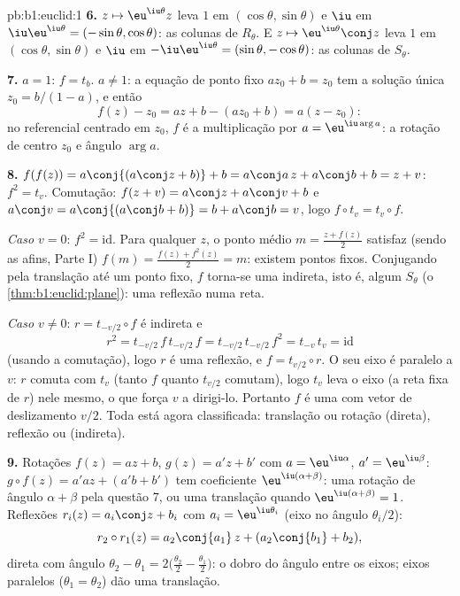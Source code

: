 \begin{solution}{pb:b1:euclid:1}
\textbf{6.} $z \mapsto \eu^{\iu\theta}z$ leva $1$ em $(\cos\theta, \sin\theta)$ e $\iu$ em $\iu\eu^{\iu\theta} = (-\sin\theta, \cos\theta)$: as colunas de
$R_\theta$. E $z \mapsto \eu^{\iu\theta}\conj z$ leva $1$ em $(\cos\theta, \sin\theta)$ e $\iu$ em $-\iu\eu^{\iu\theta} =
(\sin\theta, -\cos\theta)$: as colunas de
$S_\theta$.

\textbf{7.} $a = 1$: $f = t_b$. $a \neq 1$: a equação de ponto fixo $az_0 + b = z_0$
tem a solução única $z_0 = b/(1 -
a)$, e então
\[
f(z) - z_0 = az + b - (az_0 + b) = a(z - z_0):
\]
no referencial centrado em $z_0$, $f$ é a multiplicação por $a
= \eu^{\iu\arg a}$:
a rotação de centro $z_0$ e ângulo $\arg a$.

\textbf{8.} $f(f(z)) = a\conj{(a\conj z + b)} + b = a\conj a\,z
+ a\conj b + b = z + v$: $f^2 = t_v$. Comutação: $f(z + v) =
a\conj z + a\conj v + b$ e $a\conj v = a\conj{(a\conj b + b)}
= b + a\conj b = v$, logo $f\circ t_v = t_v\circ f$.

\emph{Caso $v = 0$}: $f^2 = \mathrm{id}$. Para qualquer $z$, o ponto médio $m = \frac{z + f(z)}2$
satisfaz (sendo as  afins, Parte I) $f(m) = \frac{f(z) + f^2(z)}{2} = m$: existem pontos
fixos. Conjugando pela translação até um ponto fixo, $f$ torna-se
uma   indireta, isto é, algum $S_\theta$ (o \cref{thm:b1:euclid:plane}): uma
reflexão numa reta.

\emph{Caso $v \neq 0$}: $r = t_{-v/2}\circ f$ é indireta e
\[
r^2 = t_{-v/2}\,f\,t_{-v/2}\,f = t_{-v/2}\,t_{-v/2}\,f^2
= t_{-v}\,t_v = \mathrm{id}
\]
(usando a comutação), logo $r$ é uma reflexão, e $f =
t_{v/2}\circ r$. O seu eixo
é paralelo a $v$: $r$ comuta com $t_v$ (tanto $f$ quanto $t_{v/2}$
comutam), logo $t_v$ leva o eixo (a reta fixa de $r$) nele mesmo, o
que força $v$ a dirigi-lo. Portanto $f$ é uma 
com vetor de deslizamento $v/2$. Toda  está agora
classificada: translação ou rotação (direta), reflexão ou  (indireta).

\textbf{9.} Rotações $f(z) = az + b$, $g(z) = a'z + b'$ com $a = \eu^{\iu\alpha}$, $a' = \eu^{\iu\beta}$: $g\circ f(z) =
a'az + (a'b + b')$ tem
coeficiente  $\eu^{\iu(\alpha+\beta)}$: uma rotação de ângulo $\alpha + \beta$ pela questão
7, ou uma translação quando $\eu^{\iu(\alpha+\beta)} =
1$. Reflexões $r_i(z) = a_i\conj z + b_i$ com $a_i =
\eu^{\iu\theta_i}$ (eixo
no ângulo $\theta_i/2$):
\[
r_2\circ r_1(z) = a_2\conj{a_1}\,z + (a_2\conj{b_1} + b_2),
\]
direta com ângulo $\theta_2 - \theta_1 = 2\bigl(\tfrac{\theta_2}2
- \tfrac{\theta_1}2\bigr)$: o dobro do ângulo entre os eixos; eixos
paralelos ($\theta_1 = \theta_2$) dão uma translação.


\end{solution}
